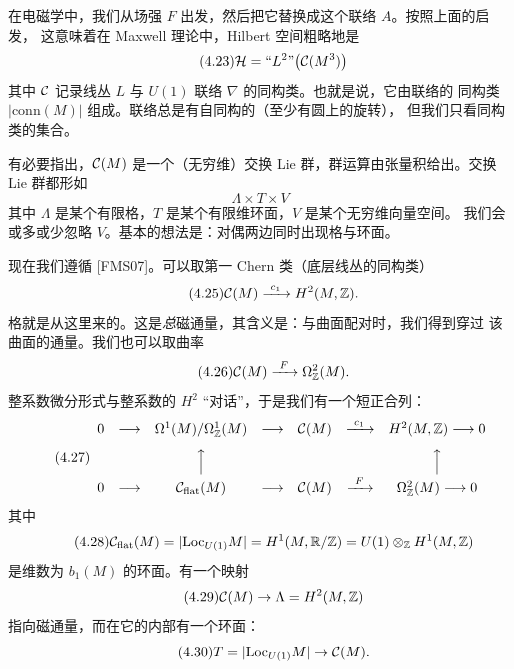 
在电磁学中，我们从场强 $F$ 出发，然后把它替换成这个联络 $A$。按照上面的启发，
这意味着在 Maxwell 理论中，Hilbert 空间粗略地是
\begin{equation}\tag{4.23}
\mathcal{H}=\text{“}L^{2}\text{”}\bigl(\mathcal{C}(M^{3})\bigr)
\end{equation}
其中 $\mathcal{C}$ 记录线丛 $L$ 与 $U(1)$ 联络 $\nabla$ 的同构类。也就是说，它由联络的
同构类 $|\mathrm{conn}(M)|$ 组成。联络总是有自同构的（至少有圆上的旋转），
但我们只看同构类的集合。

有必要指出，$\mathcal{C}(M)$ 是一个（无穷维）交换 Lie 群，群运算由张量积给出。交换
Lie 群都形如
\begin{equation}\tag{4.24}
\Lambda\times T\times V
\end{equation}
其中 $\Lambda$ 是某个有限格，$T$ 是某个有限维环面，$V$ 是某个无穷维向量空间。
我们会或多或少忽略 $V$。基本的想法是：对偶两边同时出现格与环面。

现在我们遵循 [FMS07]。可以取第一 Chern 类（底层线丛的同构类）
\begin{equation}\tag{4.25}
\mathcal{C}(M)\xrightarrow{\ c_{1}\ }H^{2}(M,\mathbb{Z}).
\end{equation}
格就是从这里来的。这是\emph{总}磁通量，其含义是：与曲面配对时，我们得到穿过
该曲面的通量。我们也可以取曲率
\begin{equation}\tag{4.26}
\mathcal{C}(M)\xrightarrow{\ F\ }\Omega^{2}_{\mathbb{Z}}(M).
\end{equation}
整系数微分形式与整系数的 $H^{2}$ “对话”，于是我们有一个短正合列：
\begin{equation}\tag{4.27}
\begin{array}{ccccccc}
0 & \longrightarrow & \Omega^{1}(M)/\Omega^{1}_{\mathbb{Z}}(M) & \longrightarrow & \mathcal{C}(M) & \xrightarrow{\ c_{1}\ } & H^{2}(M,\mathbb{Z})\longrightarrow 0\\[8pt]
 & & \Big\uparrow & & & & \Big\uparrow\\[4pt]
0 & \longrightarrow & \mathcal{C}_{\mathrm{flat}}(M) & \longrightarrow & \mathcal{C}(M) & \xrightarrow{\ F\ } & \Omega^{2}_{\mathbb{Z}}(M)\longrightarrow 0
\end{array}
\end{equation}
其中
\begin{equation}\tag{4.28}
\mathcal{C}_{\mathrm{flat}}(M)=|\mathrm{Loc}_{U(1)}M|=H^{1}(M,\mathbb{R}/\mathbb{Z})=U(1)\otimes_{\mathbb{Z}}H^{1}(M,\mathbb{Z})
\end{equation}
是维数为 $b_{1}(M)$ 的环面。有一个映射
\begin{equation}\tag{4.29}
\mathcal{C}(M)\to\Lambda=H^{2}(M,\mathbb{Z})
\end{equation}
指向磁通量，而在它的内部有一个环面：
\begin{equation}\tag{4.30}
T=|\mathrm{Loc}_{U(1)}M|\to\mathcal{C}(M).
\end{equation}

